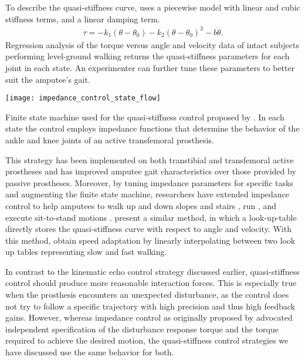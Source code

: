 To describe the quasi-stiffness curve, \citet{sup2008design} uses a piecewise
model with linear and cubic stiffness terms, and a linear damping term.
\begin{align}
    \tau = -k_1 (\theta - \theta_0) - k_2 (\theta - \theta_0)^3 - b \dot \theta.
\end{align}
Regression analysis of the torque versus angle and velocity data of intact
subjects performing level-ground walking returns the quasi-stiffness parameters
for each joint in each state. An experimenter can further tune these parameters
to better suit the amputee's gait. 
\begin{marginfigure}
    \centering
    \texttt{[image: impedance\_control\_state\_flow]}
    \caption{Finite state machine used for the quasi-stiffness control proposed
    by \citet{sup2007design}. In each state the control employs impedance
    functions that determine the behavior of the ankle and knee joints of an
    active transfemoral prosthesis.}
    \label{fig:impedance_control_state_flow}
\end{marginfigure}
This strategy has been implemented on both transtibial \citep{shultz2014walking}
and transfemoral \citep{lawson2014robotic} active prostheses and has improved
amputee gait characteristics over those provided by passive prostheses.
Moreover, by tuning impedance parameters for specific tasks and augmenting the
finite state machine, researchers have extended impedance control to help
amputees to walk up and down slopes \citep{sup2011upslope} and stairs
\citep{lawson2013control}, run \citep{huff2012running, shultz2015running}, and
execute sit-to-stand motions \citep{varol2009powered}.  \citet{lenzi2014speed}
present a similar method, in which a look-up-table directly stores the
quasi-stiffness curve with respect to angle and velocity.  With this method,
\citeauthor{lenzi2014speed} obtain speed adaptation by linearly interpolating
between two look up tables representing slow and fast walking.

In contrast to the kinematic echo control strategy discussed earlier,
quasi-stiffness control should produce more reasonable interaction forces. This
is especially true when the prosthesis encounters an unexpected disturbance, as
the control does not try to follow a specific trajectory with high precision and
thus high feedback gains. However, whereas impedance control as originally
proposed by \citet{hogan1985impedance} advocated independent specification of
the disturbance response torque and the torque required to achieve the desired
motion, the quasi-stiffness control strategies we have discussed use the same
behavior for both. 

